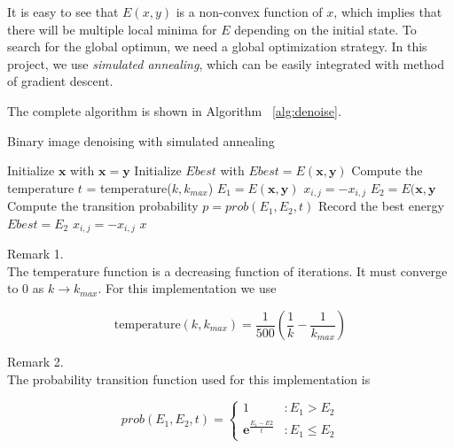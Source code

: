 \documentclass{article}
\begin{document}
It is easy to see that $E(x,y)$ is a non-convex function of $x$, which implies that there will be multiple local minima for $E$ depending on the initial state. To search for the global optimun, we need a global optimization strategy. In this project, we use \textit{simulated annealing}, which can be easily integrated with method of gradient descent.

The complete algorithm is shown in Algorithm ~\ref{alg:denoise}.

\begin{algorithm}
\centering
\caption{Binary image denoising with simulated annealing}
\label{alg:denoise}
  \begin{algorithmic}[1]
        \State Initialize $\mathbf{x}$ with $\mathbf{x} = \mathbf{y}$
        \State Initialize $Ebest$ with $Ebest = E(\mathbf{x}, \mathbf{y})$
	    	\State Compute the temperature $t$ = temperature($k,k_{max}$)
	    		\State $E_1 = E(\mathbf{x}, \mathbf{y})$
	    		\State $x_{i,j} = - x_{i,j}$ 
	    		\State $E_2 = E(\mathbf{x}, \mathbf{y}$
	    		\State Compute the transition probability $p = prob(E_1, E_2, t)$
		    			\State Record the best energy $Ebest = E_2$
		    		\EndIf
		    	\Else
		    		\State $x_{i,j} = - x_{i,j}$ 
		    	\EndIf
	    	\EndFor
	    \EndFor
      \Return $x$
    \EndFunction
  \end{algorithmic}
\end{algorithm}

\begin{description}
\item Remark 1.\hfill \\
The temperature function is a decreasing function of iterations. It must converge to $0$ as $k \to k_{max}$. For this implementation we use

$$
\text{temperature}(k, k_{max}) = \frac{1}{500}(\frac{1}{k} - \frac{1}{k_{max}})
$$

\item Remark 2.\hfill \\
The probability transition function used for this implementation is

$$
prob(E_1, E_2, t) =  \left\{
     \begin{array}{lr}
       1 & : E_1 > E_2 \\
       \mathbf{e}^{\frac{E_1 - E2}{t}} & : E_1 \leq E_2
     \end{array}
   \right.
$$

\end{description}
\end{document}
